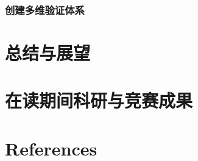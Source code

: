 \documentclass[UTF8]{beamer}
\begin{document}


\subsubsection{创建多维验证体系}



\section{总结与展望}



\section{在读期间科研与竞赛成果}



\section{References}


\end{document}
